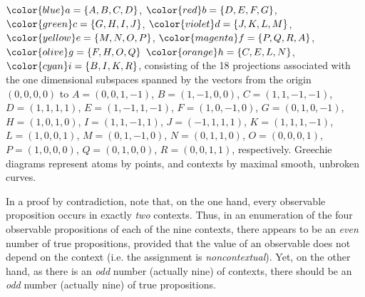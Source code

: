 $\color{blue}a=\{A,B,C,D\}$,
$\color{red}b=\{D,E,F,G\}$,
$\color{green}c=\{G,H,I,J\}$,
$\color{violet}d=\{J,K,L,M\}$,
$\color{yellow}e=\{M,N,O,P\}$,
$\color{magenta}f=\{P,Q,R,A\}$,
$\color{olive}g=\{F,H,O,Q\}$
$\color{orange}h=\{C,E,L,N\}$,
$\color{cyan}i=\{B,I,K,R\}$,
consisting of the 18 projections associated with the one dimensional subspaces spanned by  the vectors from the origin $(0,0,0,0)$ to
$ A=(0,0,1,-1)    $,
$ B=(1,-1,0,0)    $,
$ C=(1,1,-1,-1)   $,
$ D=(1,1,1,1)     $,
$  E=(1,-1,1,-1)  $,
$  F=(1,0,-1,0)   $,
$  G=(0,1,0,-1)   $,
$  H=(1,0,1,0)    $,
$  I=(1,1,-1,1)   $,
$ J=(-1,1,1,1)    $,
$ K=(1,1,1,-1)    $,
$ L=(1,0,0,1)     $,
$ M=(0,1,-1,0)    $,
$  N=(0,1,1,0)    $,
$  O=(0,0,0,1)    $,
$  P=(1,0,0,0)    $,
$  Q=(0,1,0,0)    $,
$  R=(0,0,1,1)    $, respectively.
%
Greechie diagrams represent atoms by points, and  contexts by maximal smooth, unbroken curves.

{\color{OliveGreen}\bproof
In a proof by contradiction, note that, on the one hand, every observable proposition occurs in exactly {\em two} contexts.
Thus, in an enumeration of the four observable propositions of each of the nine contexts,
there appears to be an {\em even} number of true propositions,
provided that the value of an observable does not depend on the context (i.e. the assignment is {\em noncontextual}).
Yet, on the other hand, as there is an {\em odd} number (actually nine) of contexts,
there should be an {\em odd} number (actually nine) of true propositions.
\bproof
}





\begin{center}
{\color{olive}   \Huge
 \floweroneleft
}
\end{center}


